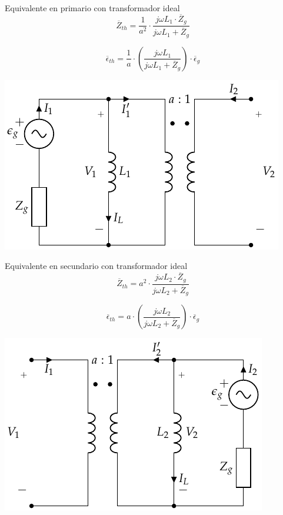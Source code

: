 \documentclass[xcolor={usenames,svgnames,dvipsnames}]{beamer}
\begin{document}
\begin{frame}[label={sec:org5575a21}]{Equivalente en primario con transformador ideal}
\[
  \overline{Z}_{th} = \frac{1}{a^2} \cdot \frac{j \omega L_1 \cdot \overline{Z}_g}{j\omega L_1 + \overline{Z}_g}
\]

\[
  \overline{\epsilon}_{th} = \frac{1}{a} \cdot \left(\frac{j\omega L_1}{j\omega L_1 + \overline{Z}_g}\right) \cdot \overline{\epsilon}_g
\]

\begin{center}
\includegraphics[height=0.5\textheight]{../figs/TrafoPerfecto_Ideal_FuentePrim.pdf}
\end{center}
\end{frame}
\begin{frame}[label={sec:org3c4df0d}]{Equivalente en secundario con transformador ideal}
\[
  \overline{Z}_{th} = a^2 \cdot \frac{j \omega L_2 \cdot \overline{Z}_g}{j\omega L_2 + \overline{Z}_g}
\]

\[
  \overline{\epsilon}_{th} = a \cdot \left(\frac{j\omega L_2}{j\omega L_2 + \overline{Z}_g}\right) \cdot \overline{\epsilon}_g
\]

\begin{center}
\includegraphics[height=0.5\textheight]{../figs/TrafoPerfecto_Ideal_FuenteSec.pdf}
\end{center}
\end{frame}
\end{document}
